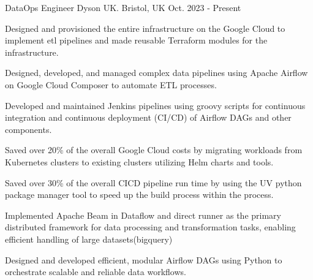 

\begin{cventries}

  \cventry
    {DataOps Engineer} %
    {Dyson UK.} %
    {Bristol, UK} %
    {Oct. 2023 - Present} %
    {
      \begin{cvitems} %
        \item {Designed and provisioned the entire infrastructure on the Google Cloud to implement etl pipelines and made reusable Terraform modules for the infrastructure.}
        \item {Designed, developed, and managed complex data pipelines using Apache Airflow on Google Cloud Composer to automate ETL processes.}
        \item {Developed and maintained Jenkins pipelines using groovy scripts for continuous integration and continuous deployment (CI/CD) of Airflow DAGs and other components.}
        \item {Saved over 20\% of the overall Google Cloud costs by migrating workloads from Kubernetes clusters to existing clusters utilizing Helm charts and tools.}
        \item {Saved over 30\% of the overall CICD pipeline run time by using the UV python package manager tool to speed up the build process within the process.}
        \item {Implemented Apache Beam in Dataflow and direct runner as the primary distributed framework for data processing and transformation tasks, enabling efficient handling of large datasets(bigquery)}
        \item {Designed and developed efficient, modular Airflow DAGs using Python to orchestrate scalable and reliable data workflows.}
      \end{cvitems}
    }


\end{cventries}
